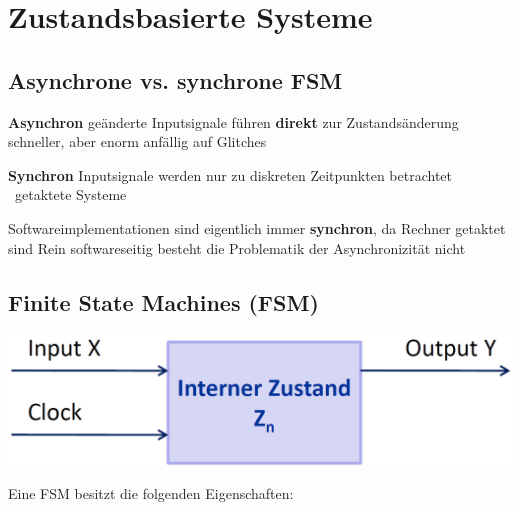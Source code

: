 \section{Zustandsbasierte Systeme}

\subsection{Asynchrone vs. synchrone FSM}

\begin{minipage}[t]{0.48\columnwidth}
    \raggedright
    \begin{outline}
        \1 \textbf{Asynchron}
            \2 geänderte Inputsignale führen \textbf{direkt} zur Zustandsänderung
            \2 schneller, aber enorm anfällig auf Glitches
    \end{outline}
\end{minipage}
\hfill
\begin{minipage}[t]{0.48\columnwidth}
    \raggedright
    \begin{outline}
        \1 \textbf{Synchron}
            \2 Inputsignale werden nur zu diskreten Zeitpunkten betrachtet \\
                \textrightarrow\ getaktete Systeme
    \end{outline}
\end{minipage}

\vspace{0.2cm}

\begin{outline}
    \1 Softwareimplementationen sind eigentlich immer \textbf{synchron}, da Rechner getaktet sind
    \1 Rein softwareseitig besteht die Problematik der Asynchronizität nicht
\end{outline}


\subsection{Finite State Machines (FSM)}

\begin{center}
    \includegraphics[width=0.7\columnwidth]{images/fsm.png}
\end{center}

Eine FSM besitzt die folgenden Eigenschaften:

